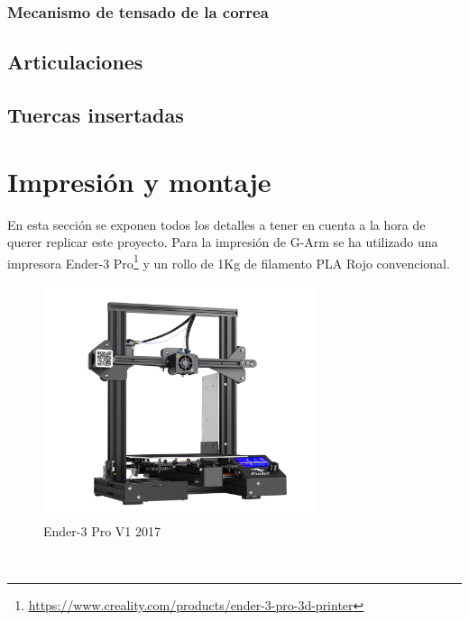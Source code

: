 \subsubsection{Mecanismo de tensado de la correa}

\subsection{Articulaciones}

\subsection{Tuercas insertadas}



\newpage
\section{Impresión y montaje}
En esta sección se exponen todos los detalles a tener en cuenta a la hora de querer replicar este proyecto. Para la impresión 
de G-Arm se ha utilizado una impresora Ender-3 Pro\footnote{\url{https://www.creality.com/products/ender-3-pro-3d-printer}} y un rollo 
de 1Kg de filamento PLA Rojo convencional.
\begin{figure} [h!]
\begin{center}
  \includegraphics[width=8cm]{figs/ender3.png}
\end{center}
\caption{Ender-3 Pro V1 2017}
\label{fig:ender3pro}
\end{figure}\   

